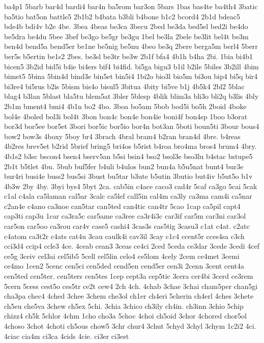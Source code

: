 {ba4p1
5barb
bar4d
bardi4
bar4n
ba5rom
bar3on
5bars
1bas
bas4te
ba4th4
3batic
ba5tio
bat5on
battle5
2b1b2
b4bata
b3bli
b4bone
b1c2
bcord4
2b1d
bdeac5
bde4b
bdi4v
b2e
4be.
3bea
4beas
be3ca
3becu
2bed
be3da
bed5el
bed2i
be4do
be5dra
be4du
5bee
3bef
be3go
be5gr
be3gu
1bel
be3la
2bele
be3lit
bel4t
be3m
ben4d
bend5a
bend5er
be1ne
be5nig
be5nu
4beo
be3q
2bere
berga5m
berl4
5berr
ber5s
b5ertin
be1s2
2bes.
be3sl
be3tr
be3w
2b1f
bfa4
4b1h
b4ha
2bi.
1bia
bi4b1
bicen5
3b2id
bid5i
b4ie
bi4ers
bif4
bi4fid.
bi5ga
bigu3
b1il
b2ile
5biles
3b2ill
4bim
bimet5
5bina
5bin4d
bind3e
bin5et
bin5i4
1bi2o
bio3l
bio5m
bi3ou
bip4
bi5q
bir4
bi3re4
bi5rus
b2is
5bism
bis4o
bisul5
3bitua
4bity
bi5ve
b1j
4b5k4
2bl2
5blac
blag4
b3lan
5blast
bla5tu
blem5at
3bler
5blesp
4blik
blim3a
bli3o
bli2q
b3lis
4bly
2b1m
bment4
bmi4
4b1n
bo2
4bo.
3boa
bo5am
5bob
bod5i
bo5h
2boid
4boke
bol4e
4boled
bol3i
bol4t
3bon
bon4c
bon4e
bon4ie
boni4f
bon4sp
1boo
b3orat
bor3d
bor5ee
bor5et
3bori
bor5ic
bor5io
bor4n
bot3an
5boti
boun5ti
3bour
bous4
bow2
bow3s
4boxy
5boy
br4
3brach
4bral
bram4
b2ran
bran4d
4bre.
b4reas
4b2res
brev5et
b2rid
5brief
bring5
bri4os
b5rist
b4roa
bro4ma
bros4
brum4
4bry.
4b1s2
b3sc
bscon4
bsen4
bserv5an
b5si
bsin4
bso2
bsol3e
bso3lu
b4stac
bstupe5
2b1t
b5tlet
4bu.
5bub
buf5fer
b4uli
b4ulos
bun2
bun4a
b5u5nat
bunt4
bur3e
bur4ri
busi4e
buss2
bus5si
3bust
bu5tar
b3ute
b5utin
3butio
but4iv
b5ut5o
b1v
4b3w
2by
4by.
3byi
bys4
5byt
2ca.
cab5in
c4ace
caco3
cad4r
5caf
ca3go
5cai
5cak
c1al
c4ala
ca5laman
cal5ar
3calc
ca5lef
call5in
cal4m
ca3ly
ca3ma
cam4i
ca5nar
c2an4e
c4ano
ca3noe
can5tar
can5ted
can4tic
can4tr
5cao
1cap
ca5pil
capt4
cap3ti
cap3u
1car
ca3ra5c
car5ame
ca3ree
ca3r4i3c
car3if
car5m
car3ni
car3ol
car5on
car5oo
ca3rou
car4v
case5
cashi4
3cas3s
cas5tig
3casu3
c1at
c4at.
c2atc
c4atom
ca3t2r
c4ats
cat4u
3cau
caulk4i
cav3il
3cay
c1c4
ccent5r
cces4sa
c3ch
cci3d4
ccip4
ccle3
4ce.
4ceab
cean3
3ceas
ce4ci
2ced
5ceda
ce3dar
3cede
3cedi
4cef
ce5g
3ceiv
cel3ai
cel5ib5
5cell
cel5lin
celo4
ce5lom
4cely
2cem
ce4met
3cemi
ce4mo
1cen2
5cenc
cen5ci
cen5ded
cend5en
cend5er
cen3i
2cenn
3cent
cent4a
cen5ted
cen5ter.
cen5ters
cen5tes
1cep
cept3a
cep5tic
3cera
cer4bi
3cerd
ce3rem
5cern
5cess
cest5o
ces5tr
ce2t
cew4
2ch
4ch.
4chab
3chae
3chai
cham5per
chan5gi
cha3pa
chec4
4ched
3chee
3chem
che3ol
ch1er
ch4eri
5cherin
ch4erl
4ches
3chete
ch5eu
che5va
3chew
ch5ex
5chi.
3chia
3chico
ch3ily
ch4in.
ch3inn
3chio
5chip
chizz4
ch5k
5chlor
4chm
1cho
cho3a
5choc
4choi
ch5oid
3chor
4chored
chor5ol
4choso
3chot
4choti
ch5ous
chow5
3chr
chur4
3chut
5chyd
3chyl
3chym
1c2i2
4ci.
4ciac
cia4m
ci3ca
4cids
4cie.
ci3er
ci3est
}

